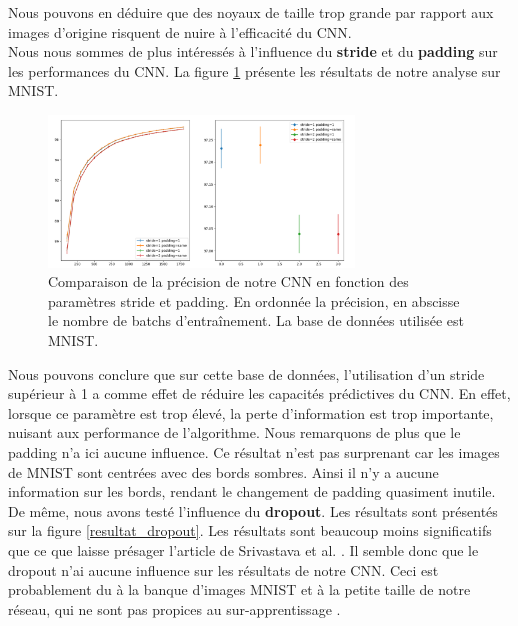 Nous pouvons en déduire que des noyaux de taille trop grande par rapport aux images d'origine risquent de nuire à l'efficacité du CNN. \\

Nous nous sommes de plus intéressés à l'influence du \textbf{stride} et du \textbf{padding} sur les performances du CNN. La figure \ref{resultat_padding_stride} présente les résultats de notre analyse sur MNIST.

\begin{figure}[!h]
\centering
\includegraphics[width=230pt]{images/cnn/CNN_padding_stride.png}
\caption{Comparaison de la précision de notre CNN en fonction des paramètres stride et padding. En ordonnée la précision, en abscisse le nombre de batchs d’entraînement. La base de données utilisée est MNIST.}
\label{resultat_padding_stride}
\end{figure}

Nous pouvons conclure que sur cette base de données, l'utilisation d'un stride supérieur à 1 a comme effet de réduire les capacités prédictives du CNN. En effet, lorsque ce paramètre est trop élevé, la perte d'information est trop importante, nuisant aux performance de l'algorithme. Nous remarquons de plus que le padding n'a ici aucune influence. Ce résultat n'est pas surprenant car les images de MNIST sont centrées avec des bords sombres. Ainsi il n'y a aucune information sur les bords, rendant le changement de padding quasiment inutile. \\

De même, nous avons testé l'influence du \textbf{dropout}. Les résultats sont présentés sur la figure \ref{resultat_dropout}. Les résultats sont beaucoup moins significatifs que ce que laisse présager l'article de Srivastava et al. \cite{srivastava_dropout_nodate}. Il semble donc que le dropout n'ai aucune influence sur les résultats de notre CNN. Ceci est probablement du à la banque d'images MNIST et à la petite taille de notre réseau, qui ne sont pas propices au sur-apprentissage .
  
